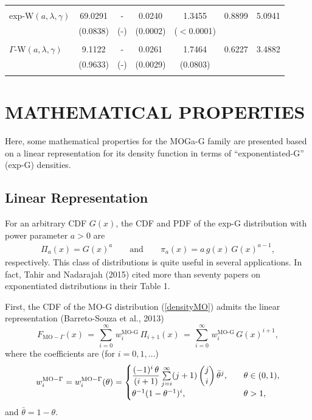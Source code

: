 \documentclass[twoside,leqno,11pt]{article}
\begin{document}
\begin{table}[H]
{\begin{tabular}{lcccccc}
 & & & & &  \\
 exp-W$(a,\lambda,\gamma)$   &    69.0291  & - &   0.0240 & 1.3455 &   0.8899   & 5.0941 \\
                          &   (0.0838) & (-) & (0.0002) & ($<$0.0001)   &  & \\

 & & & & &  \\
 $\Gamma$-W$(a,\lambda,\gamma)$    & 9.1122   & - &  0.0261 & 1.7464 &    0.6227 & 3.4882  \\
                             &  (0.9633)&  (-)&  (0.0029) & (0.0803)     &  & \\

 & & & & &  \\
                          \hline
\end{tabular}}
\end{table}


\section{MATHEMATICAL PROPERTIES}\label{properties}

Here, some mathematical properties for the MOGa-G family are presented based on a linear representation for its density 
function in terms of ``exponentiated-G'' (exp-G) densities.

\subsection{Linear Representation}

For an arbitrary CDF $G(x)$, the CDF and PDF of the exp-G distribution with power parameter $a>0$ are
\begin{eqnarray*}
\Pi_a(x)=G(x)^a\qquad\text{and}\qquad\pi_a(x)=a\,g(x)\,G(x)^{a-1},
\end{eqnarray*}
respectively. This class of distributions is quite useful 
in several applications. In fact, Tahir and Nadarajah (2015)
cited more than seventy papers on exponentiated distributions 
in their Table 1.

First, the CDF of the MO-G distribution (\ref{densityMO}) 
admits the linear representation (Barreto-Souza et al., 2013)
\begin{equation}
F_{\text{MO}-\Gamma}(x)
\,=\,
\sum^{\infty}_{i=0}\,w_i^{\text{MO-G}}\,\Pi_{i+1}(x)\,=\,\sum^{\infty}_{i=0}\,w_i^{\text{MO-G}}\,G(x)^{i+1},
\label{EXP44}
\end{equation}
where the coefficients are (for $i=0,1,\ldots$)
\[
w_i^{\text{MO}-\Gamma}=w_i^{\text{MO}-\Gamma}(\theta) =
\begin{cases}
\dfrac{(-1)^i\,\theta}{(i+1)} \sum\limits^{\infty}_{j=i}(j+1)\,\dbinom{j}{i}\,\bar{\theta}^j,& \quad \theta\in (0,1),\\
\theta^{-1} (1-\theta^{-1})^i,& \quad \theta>1,
\end{cases}
\]
and $\bar{\theta}=1-\theta$.
\end{document}
